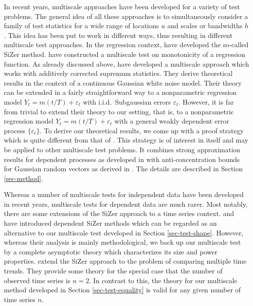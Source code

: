 In recent years, multiscale approaches have been developed for a variety of test problems. The general idea of all these approaches is to simultaneously consider a family of test statistics for a wide range of locations $u$ and scales or bandwidths $h$. This idea has been put to work in different ways, thus resulting in different multiscale test approaches. In the regression context, \cite{ChaudhuriMarron1999,ChaudhuriMarron2000} have developed the so-called SiZer method. 
\cite{HallHeckman2000} have constructed a multiscale test on monotonicity of a regression function. As already discussed above, \cite{DuembgenSpokoiny2001} have developed a multiscale approach which works with additively corrected supremum statistics. They derive theoretical results in the context of  a continuous Gaussian white noise model. Their theory can be extended in a fairly straightforward way to a nonparametric regression model $Y_t = m(t/T) + \varepsilon_t$ with i.i.d.\ Subgaussian errors $\varepsilon_t$. However, it is far from trivial to extend their theory to our setting, that is, to a nonparametric regression model $Y_t = m(t/T) + \varepsilon_t$ with a general weakly dependent error process $\{\varepsilon_t\}$. To derive our theoretical results, we come up with a proof strategy which is quite different from that of \cite{DuembgenSpokoiny2001}. This strategy is of interest in itself and may be applied to other multiscale test problems. It combines strong approximation results for dependent processes as developed in \cite{BerkesLiuWu2014} with anti-concentration bounds for Gaussian random vectors as derived in \cite{Chernozhukov2015}. The details are described in Section \ref{sec-method}.

Whereas a number of multiscale tests for independent data have been developed in recent years, multiscale tests for dependent data are much rarer. Most notably, there are some extensions of the SiZer approach to a time series context. \cite{Rondonotti2004} and \cite{Rondonotti2007} have introduced dependent SiZer methods which can be regarded as an alternative to our multiscale test developed in Section \ref{sec-test-shape}. However, whereas their analysis is mainly methodological, we back up our multiscale test by a complete asymptotic theory which characterizes its size and power properties. \cite{Park2009} extend the SiZer approach to the problem of comparing multiple time trends. They provide some theory for the special case that the number of observed time series is $n=2$. In contrast to this, the theory for our multiscale method developed in Section \ref{sec-test-equality} is valid for any given number of time series $n$.


